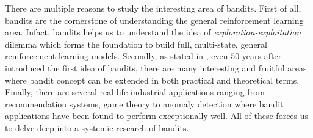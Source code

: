 	There are multiple reasons to study the interesting area of bandits. First of all, bandits are the cornerstone of understanding the general reinforcement learning area. Infact, bandits helps us to understand the idea of \textit{exploration-exploitation} dilemma which forms the foundation to build full, multi-state, general reinforcement learning models. Secondly, as stated in \citet{maillard2011apprentissage}, even $50$ years after \cite{robbins1952some} introduced the first idea of bandits, there are many interesting and fruitful areas where bandit concept can be extended in both practical and theoretical terms. Finally, there are several real-life industrial applications ranging from recommendation systems, game theory to anomaly detection where bandit applications have been found to perform exceptionally well. All of these forces us to delve deep into a systemic research of bandits.

	
%
%

